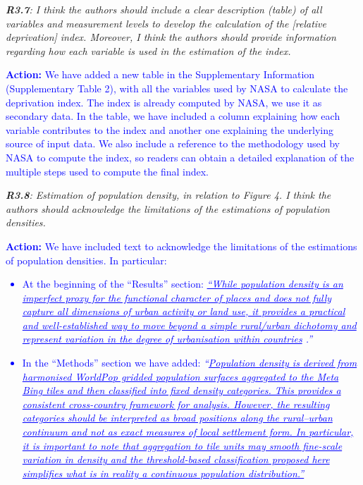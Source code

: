\documentclass[12pt,a4paper,oneside, reqno]{amsart}
\begin{document}
\setlength{\leftskip}{0cm} \textit{\textbf{R3.7}: I think the authors should include a clear description (table) of all variables and measurement levels to develop the calculation of the [relative deprivation] index. Moreover, I think the authors should provide information regarding how each variable is used in the estimation of the index.}

\setlength{\leftskip}{1cm}\textcolor{blue}{\textbf{Action:} We have added a new table in the Supplementary Information (Supplementary Table 2), with all the variables used by NASA to calculate the deprivation index. The index is already computed by NASA, we use it as secondary data. In the table, we have included a column explaining how each variable contributes to the index and another one explaining the underlying source of input data. We also include a reference to the methodology used by NASA to compute the index, so readers can obtain a detailed explanation of the multiple steps used to compute the final index.}

\setlength{\leftskip}{0cm} \textit{\textbf{R3.8}: Estimation of population density, in relation to Figure 4. I think the authors should acknowledge the limitations of the estimations of population densities.}

\setlength{\leftskip}{1cm}\textcolor{blue}{\textbf{Action:} We have included text to acknowledge the limitations of the estimations of population densities. In particular:
\begin{itemize}[noitemsep, topsep=0pt]
    \item At the beginning of the ``Results'' section: \textit{\uline{``While population density is an imperfect proxy for the functional character of places and does not fully capture all dimensions of urban activity or land use, it provides a practical and well-established way to move beyond a simple rural/urban dichotomy and represent variation in the degree of urbanisation within countries} \parencite{championhugo2004, rees1999internal, rees2017impact, UNpopulation25, GHSL19}.'' }
    \item In the ``Methods'' section we have added: \textit{``\uline{Population density is derived from harmonised WorldPop gridded population surfaces aggregated to the Meta Bing tiles and then classified into fixed density categories. This provides a consistent cross-country framework for analysis. However, the resulting categories should be interpreted as broad positions along the rural–urban continuum and not as exact measures of local settlement form. In particular, it is important to note that aggregation to tile units may smooth fine-scale variation in density and the threshold-based classification proposed here simplifies what is in reality a continuous population distribution.''}}
\end{itemize}}
\end{document}

